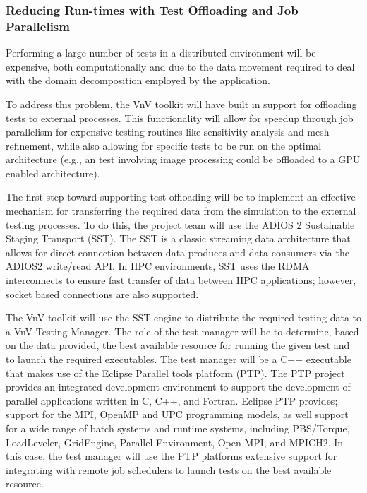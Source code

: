 
\subsubsection{Reducing Run-times with Test Offloading and Job Parallelism}

Performing a large number of \VV tests in a distributed environment will be expensive, both computationally and due to the data movement required to deal with the domain decomposition employed by the application. 

To address this problem, the VnV toolkit will have built in support for offloading tests to external processes. This functionality will allow for speedup through job parallelism for expensive testing routines like sensitivity analysis and mesh refinement, while also allowing for specific tests to be run on the optimal architecture (e.g., an test involving image processing could be offloaded to a GPU enabled architecture).  

The first step toward supporting test offloading will be to implement an effective mechanism for transferring the required 
data from the simulation to the external testing processes. To do this, the project team will use the ADIOS 2 Sustainable Staging Transport (SST). The SST is a classic streaming data architecture that allows for direct connection between data produces and data consumers via the ADIOS2 write/read API. In HPC environments, SST uses the RDMA interconnects to ensure fast transfer of data between HPC applications; however, socket based connections are also supported. 

The VnV toolkit will use the SST engine to distribute the required testing data to a VnV Testing Manager. The role of the test manager will be to determine, based on the data provided, the best available resource for running the given test and to launch the required executables. The test manager will be a C++ executable that makes use of the Eclipse Parallel tools platform (PTP). The PTP project provides an integrated development environment to support the development of parallel applications written in C, C++, and Fortran. Eclipse PTP provides; support for the MPI, OpenMP and UPC programming models, as well support for a wide range of batch systems and runtime systems, including PBS/Torque, LoadLeveler, GridEngine, Parallel Environment, Open MPI, and MPICH2. In this case, the test manager will use the PTP platforms extensive support for integrating with remote job schedulers to launch tests on the best available resource. 

